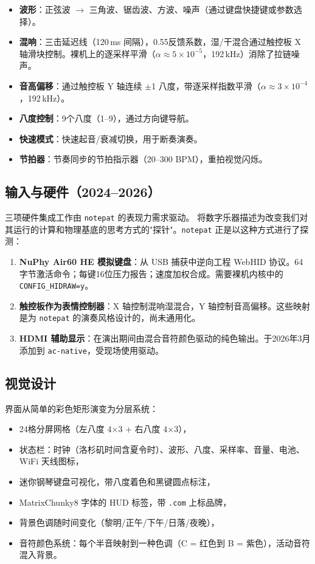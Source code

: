 \documentclass[10pt,letterpaper,twocolumn]{article}
\begin{document}
\begin{itemize}
  \item \textbf{波形}：正弦波 $\rightarrow$ 三角波、锯齿波、方波、噪声（通过键盘快捷键或参数选择）。
  \item \textbf{混响}：三击延迟线（120\,ms 间隔），0.55反馈系数，湿/干混合通过触控板 X 轴滑块控制。裸机上的逐采样平滑（$\alpha \approx 5 \times 10^{-5}$，192\,kHz）消除了拉链噪声。
  \item \textbf{音高偏移}：通过触控板 Y 轴连续 $\pm$1 八度，带逐采样指数平滑（$\alpha \approx 3 \times 10^{-4}$，192\,kHz）。
  \item \textbf{八度控制}：9个八度（1--9），通过方向键导航。
  \item \textbf{快速模式}：快速起音/衰减切换，用于断奏演奏。
  \item \textbf{节拍器}：节奏同步的节拍指示器（20--300 BPM），重拍视觉闪烁。
\end{itemize}

\subsection{输入与硬件（2024--2026）}

三项硬件集成工作由 \texttt{notepat} 的表现力需求驱动。\citet{tahiroglu2020probes} 将数字乐器描述为改变我们对其运行的计算和物理基底的思考方式的"探针"。\texttt{notepat} 正是以这种方式进行了探测：

\begin{enumerate}
  \item \textbf{NuPhy Air60 HE 模拟键盘}：从 USB 捕获中逆向工程 WebHID 协议。64字节激活命令；每键16位压力报告；速度加权合成。需要裸机内核中的 \texttt{CONFIG\_HIDRAW=y}。
  \item \textbf{触控板作为表情控制器}：X 轴控制混响湿混合，Y 轴控制音高偏移。这些映射是为 \texttt{notepat} 的演奏风格设计的，尚未通用化。
  \item \textbf{HDMI 辅助显示}：在演出期间由混合音符颜色驱动的纯色输出。于2026年3月添加到 \texttt{ac-native}，受现场使用驱动。
\end{enumerate}

\subsection{视觉设计}

界面从简单的彩色矩形演变为分层系统：

\begin{itemize}
  \item 24格分屏网格（左八度 4$\times$3 + 右八度 4$\times$3），
  \item 状态栏：时钟（洛杉矶时间含夏令时）、波形、八度、采样率、音量、电池、WiFi 天线图标，
  \item 迷你钢琴键盘可视化，带八度着色和黑键圆点标注，
  \item MatrixChunky8 字体的 HUD 标签，带 \texttt{.com} 上标品牌，
  \item 背景色调随时间变化（黎明/正午/下午/日落/夜晚），
  \item 音符颜色系统：每个半音映射到一种色调（C = 红色到 B = 紫色），活动音符混入背景。
\end{itemize}
\end{document}
